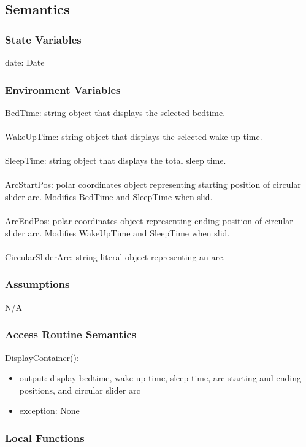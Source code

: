 \documentclass[12pt, titlepage]{article}
\begin{document}
\subsection{Semantics}

\subsubsection{State Variables}
date: Date

\subsubsection{Environment Variables}
BedTime: string object that displays the selected bedtime.\\\\
WakeUpTime: string object that displays the selected wake up time.\\\\
SleepTime: string object that displays the total sleep time.\\\\
ArcStartPos: polar coordinates object representing starting position of circular slider arc. Modifies BedTime and SleepTime when slid.\\\\
ArcEndPos: polar coordinates object representing ending position of circular slider arc. Modifies WakeUpTime and SleepTime when slid.\\\\
CircularSliderArc: string literal object representing an arc.
\subsubsection{Assumptions}

N/A

\subsubsection{Access Routine Semantics}

\noindent DisplayContainer():
\begin{itemize}
	\item output: display bedtime, wake up time, sleep time, arc starting and ending positions, and circular slider arc
	\item exception: None
\end{itemize}

\subsubsection{Local Functions}
\end{document}
